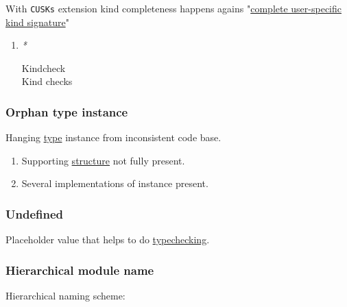 \documentclass[11pt]{article}
\begin{document}
With \texttt{CUSKs} extension \label{org8fa5c25}kind completeness happens agains "\hyperref[orgdafd0e0]{complete user-specific kind signature}"\\

\begin{enumerate}
\item \emph{*}
\label{sec:orgc1c6abd}

\label{org283cdfb}Kindcheck\\
\label{orgeeaffef}Kind checks\\
\end{enumerate}

\subsubsection{\label{org07da40f}Orphan type instance}
\label{sec:orgca388ca}
Hanging \hyperref[org4fbaeb8]{type} instance from inconsistent code base.\\
\begin{enumerate}
\item Supporting \hyperref[org93ee82c]{structure} not fully present.\\
\item Several implementations of instance present.\\
\end{enumerate}

\subsubsection{\label{org264729a}Undefined}
\label{sec:org0c48b14}
Placeholder value that helps to do \hyperref[org84c913f]{typechecking}.\\

\subsubsection{\label{orgf2e653a}Hierarchical module name}
\label{sec:orga47222c}
Hierarchical naming scheme:\\
\end{document}
